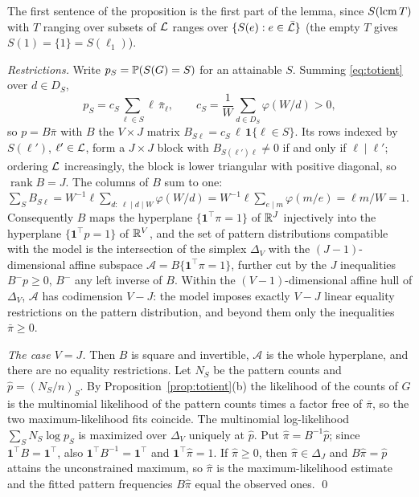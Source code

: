 The first sentence of the proposition is the first part of the lemma, since $S(\operatorname{lcm} T)$ with $T$ ranging over subsets of $\mathcal{L}$ ranges over $\{S(e):e\in\bar{\mathcal{L}}\}$ (the empty $T$ gives $S(1)=\{1\}=S(\ell_1)$).

\emph{Restrictions.} Write $p_S=\mathbb{P}(S(G)=S)$ for an attainable $S$. Summing \eqref{eq:totient} over $d\in D_S$,
\begin{equation}\label{eq:S-B}
p_S=c_S\sum_{\ell\in S}\ell\,\bar\pi_\ell,\qquad c_S=\frac1W\sum_{d\in D_S}\varphi(W/d)>0,
\end{equation}
so $p=B\bar\pi$ with $B$ the $V\times J$ matrix $B_{S\ell}=c_S\,\ell\,\mathbf 1\{\ell\in S\}$. Its rows indexed by $S(\ell')$, $\ell'\in\mathcal{L}$, form a $J\times J$ block with $B_{S(\ell')\ell}\ne0$ if and only if $\ell\mid\ell'$; ordering $\mathcal{L}$ increasingly, the block is lower triangular with positive diagonal, so $\operatorname{rank}B=J$. The columns of $B$ sum to one: $\sum_SB_{S\ell}=W^{-1}\ell\sum_{d:\ \ell\mid d\mid W}\varphi(W/d)=W^{-1}\ell\sum_{e\mid m}\varphi(m/e)=\ell m/W=1$. Consequently $B$ maps the hyperplane $\{\mathbf 1^\top\pi=1\}$ of $\mathbb{R}^J$ injectively into the hyperplane $\{\mathbf 1^\top p=1\}$ of $\mathbb{R}^V$, and the set of pattern distributions compatible with the model is the intersection of the simplex $\Delta_V$ with the $(J-1)$-dimensional affine subspace $\mathcal A=B\{\mathbf 1^\top\pi=1\}$, further cut by the $J$ inequalities $B^{-}p\ge0$, $B^{-}$ any left inverse of $B$. Within the $(V-1)$-dimensional affine hull of $\Delta_V$, $\mathcal A$ has codimension $V-J$: the model imposes exactly $V-J$ linear equality restrictions on the pattern distribution, and beyond them only the inequalities $\bar\pi\ge0$.

\emph{The case $V=J$.} Then $B$ is square and invertible, $\mathcal A$ is the whole hyperplane, and there are no equality restrictions. Let $N_S$ be the pattern counts and $\hat p=(N_S/n)_S$. By Proposition~\ref{prop:totient}(b) the likelihood of the counts of $G$ is the multinomial likelihood of the pattern counts times a factor free of $\bar\pi$, so the two maximum-likelihood fits coincide. The multinomial log-likelihood $\sum_SN_S\log p_S$ is maximized over $\Delta_V$ uniquely at $\hat p$. Put $\hat\pi=B^{-1}\hat p$; since $\mathbf 1^\top B=\mathbf 1^\top$, also $\mathbf 1^\top B^{-1}=\mathbf 1^\top$ and $\mathbf 1^\top\hat\pi=1$. If $\hat\pi\ge0$, then $\hat\pi\in\Delta_J$ and $B\hat\pi=\hat p$ attains the unconstrained maximum, so $\hat\pi$ is the maximum-likelihood estimate and the fitted pattern frequencies $B\hat\pi$ equal the observed ones. \qed

